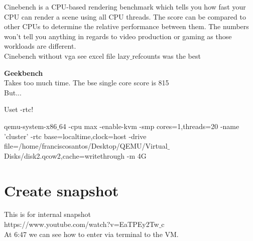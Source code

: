 \documentclass[11pt, a4paper, oneside]{article}
\theoremstyle{definition}
\begin{document}
     Cinebench is a CPU-based rendering benchmark which tells you how fast your CPU can render a scene using all CPU threads. The score can be compared to other CPUs to determine the relative performance between them. The numbers won't tell you anything in regards to video production or gaming as those workloads are different.\\
     
     Cinebench without vga see excel file
     lazy$\_$refcounts was the best
     
\textbf{Geekbench}\\
Takes too much time. The bse single core score is 815\\
But...

Uset -rtc!

qemu-system-x86$\_$64 -cpu max -enable-kvm -smp cores=1,threads=20 -name 'cluster' -rtc base=localtime,clock=host -drive file=/home/franciscosantos/Desktop/QEMU/Virtual$\_$Disks/disk2.qcow2,cache=writethrough -m 4G

\section{Create snapshot}
This is for internal snapshot\\
https://www.youtube.com/watch?v=EaTPEy2Tw$\_$c\\
At 6:47 we can see how to enter via terminal to the VM.\\
\end{document}
